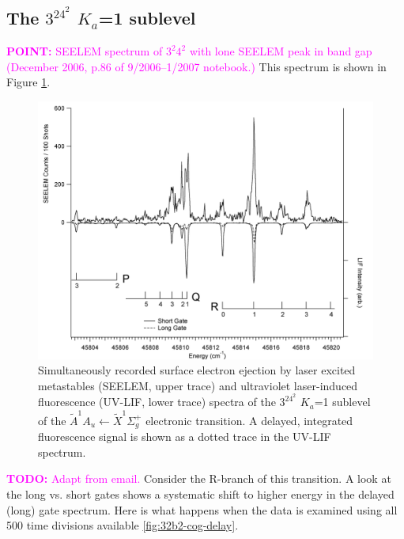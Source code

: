 \documentclass[12pt,draft]{mitthesis}
\newcommand{\TODO} [1]{\textcolor{magenta}{\textbf{TODO:} #1}}
\newcommand{\POINT}[1]{\textcolor{magenta}{\textbf{POINT:} #1}}
\begin{document}
\subsection{The $3^24^2$ $K_a$=1 sublevel}

\POINT{SEELEM spectrum of $3^2 4^2$ with lone SEELEM peak in band gap
  (December 2006, p.86 of 9/2006--1/2007 notebook.)}  This spectrum is
shown in Figure \ref{fig:spectrum-32b2}.

\begin{figure}
  \caption{
    Simultaneously recorded surface electron ejection by laser excited
    metastables (SEELEM, upper trace) and ultraviolet laser-induced
    fluorescence (UV-LIF, lower trace) spectra of the $3^24^2$ $K_a$=1
    sublevel of the $\tilde{A}^1A_u \leftarrow \tilde{X} ^1\Sigma_g^+$
    electronic transition. A delayed, integrated fluorescence signal
    is shown as a dotted trace in the UV-LIF spectrum.}
  \label{fig:spectrum-32b2}
  \centering
  \includegraphics[width=7.5in,angle=90]{spectrum-32b2.png}
\end{figure}

\TODO{Adapt from email.}  Consider the R-branch of this transition.  A
look at the long vs. short gates shows a systematic shift to higher
energy in the delayed (long) gate spectrum.  Here is what happens when
the data is examined using all 500 time divisions available
\ref{fig:32b2-cog-delay}.
\end{document}
